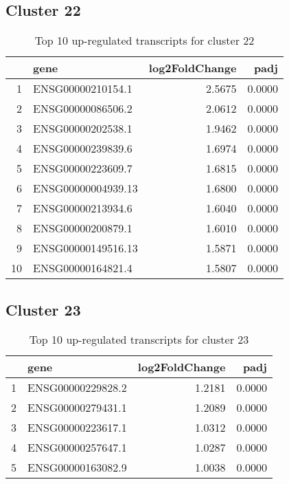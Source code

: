 \documentclass{article}
\begin{document}
\subsection{Cluster 22 }
\begin{table}[H]
\centering
\begin{tabularx}{\textwidth}{rlrr}
  \hline
 & gene & log2FoldChange & padj \\ 
  \hline
1 & ENSG00000210154.1 & 2.5675 & 0.0000 \\ 
  2 & ENSG00000086506.2 & 2.0612 & 0.0000 \\ 
  3 & ENSG00000202538.1 & 1.9462 & 0.0000 \\ 
  4 & ENSG00000239839.6 & 1.6974 & 0.0000 \\ 
  5 & ENSG00000223609.7 & 1.6815 & 0.0000 \\ 
  6 & ENSG00000004939.13 & 1.6800 & 0.0000 \\ 
  7 & ENSG00000213934.6 & 1.6040 & 0.0000 \\ 
  8 & ENSG00000200879.1 & 1.6010 & 0.0000 \\ 
  9 & ENSG00000149516.13 & 1.5871 & 0.0000 \\ 
  10 & ENSG00000164821.4 & 1.5807 & 0.0000 \\ 
   \hline
\end{tabularx}
\caption{Top 10 up-regulated transcripts for cluster 22} 
\label{tab:q3_1_22}
\end{table}
\subsection{Cluster 23 }
\begin{table}[H]
\centering
\begin{tabularx}{\textwidth}{rlrr}
  \hline
 & gene & log2FoldChange & padj \\ 
  \hline
1 & ENSG00000229828.2 & 1.2181 & 0.0000 \\ 
  2 & ENSG00000279431.1 & 1.2089 & 0.0000 \\ 
  3 & ENSG00000223617.1 & 1.0312 & 0.0000 \\ 
  4 & ENSG00000257647.1 & 1.0287 & 0.0000 \\ 
  5 & ENSG00000163082.9 & 1.0038 & 0.0000 \\ 
   \hline
\end{tabularx}
\caption{Top 10 up-regulated transcripts for cluster 23} 
\label{tab:q3_1_23}
\end{table}
\end{document}
